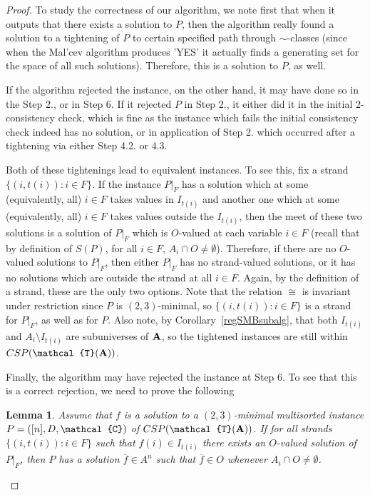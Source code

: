 \documentclass[10pt,a4paper]{amsart}
\newtheorem{lm}{Lemma}
\newcommand{\m}[1]{{\uppercase {\mathbf {#1}}}}
\newcommand{\vr}[1]{{\uppercase {\mathcal{#1}}}}
\begin{document}
\begin{proof}
To study the correctness of our algorithm, we note first that when it outputs that there exists a solution to $P$, then the algorithm really found a solution to a tightening of $P$ to certain specified path through $\sim$-classes (since when the Mal'cev algorithm produces 'YES' it actually finds a generating set for the space of all such solutions). Therefore, this is a solution to $P$, as well.

If the algorithm rejected the instance, on the other hand, it may have done so in the Step 2., or in Step 6. If it rejected $P$ in Step 2., it either did it in the initial $2$-consistency check, which is fine as the instance which fails the initial consistency check indeed has no solution, or in application of Step 2. which occurred after a tightening via either Step 4.2. or 4.3.

Both of these tightenings lead to equivalent instances. To see this, fix a strand $\{(i,t(i)):i\in F\}$. If the instance $P|_F$ has a solution which at some (equivalently, all) $i\in F$ takes values in $I_{t(i)}$ and another one which at some (equivalently, all) $i\in F$ takes values outside the $I_{t(i)}$, then the meet of these two solutions is a solution of $P|_F$ which is $O$-valued at each variable $i\in F$ (recall that by definition of $S(P)$, for all $i\in F$, $A_i\cap O\neq\emptyset$). Therefore, if there are no $O$-valued solutions to $P|_F$, then either $P|_F$ has no strand-valued solutions, or it has no solutions which are outside the strand at all $i\in F$. Again, by the definition of a strand, these are the only two options. Note that the relation $\cong$ is invariant under restriction since $P$ is $(2,3)$-minimal, so $\{(i,t(i)):i\in F\}$ is a strand for $P|_F$, as well as for $P$. Also note, by Corollary~\ref{regSMBsubalg}, that both $I_{t(i)}$ and $A_i\setminus I_{t(i)}$ are subuniverses of $\m a$, so the tightened instances are still within $CSP(\vr t(\m a))$.

Finally, the algorithm may have rejected the instance at Step 6. To see that this is a correct rejection, we need to prove the following

\begin{lm}\label{Malcev}
Assume that $f$ is a solution to a $(2,3)$-minimal multisorted instance $P=([n],D,\vr c)$ of $CSP(\vr t(\m a))$. If for all strands $\{(i,t(i)):i\in F\}$ such that $f(i)\in I_{t(i)}$ there exists an $O$-valued solution of $P|_F$, then $P$ has a solution $\overline{f}\in A^n$ such that $\overline{f}\in O$ whenever $A_i\cap O\neq\emptyset$.
\end{lm}


\end{proof}
\end{document}

